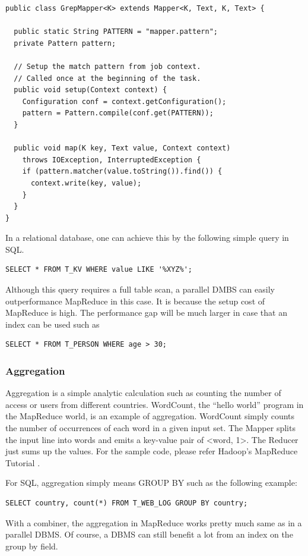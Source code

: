 \documentclass[11pt]{book}
\begin{document}
\begin{lstlisting}
public class GrepMapper<K> extends Mapper<K, Text, K, Text> {

  public static String PATTERN = "mapper.pattern";
  private Pattern pattern;

  // Setup the match pattern from job context.
  // Called once at the beginning of the task.
  public void setup(Context context) {
    Configuration conf = context.getConfiguration();
    pattern = Pattern.compile(conf.get(PATTERN));
  }

  public void map(K key, Text value, Context context)
    throws IOException, InterruptedException {
    if (pattern.matcher(value.toString()).find()) {
      context.write(key, value);
    }
  }
}
\end{lstlisting}
In a relational database, one can achieve this by the following simple query in SQL.

\lstset{language=SQL}
\begin{lstlisting}
SELECT * FROM T_KV WHERE value LIKE '%XYZ%';
\end{lstlisting}
Although this query requires a full table scan, a parallel DMBS can easily outperformance MapReduce in this case. It is because the setup cost of MapReduce is high.
The performance gap will be much larger in case that an index can be used such as

\begin{lstlisting}
SELECT * FROM T_PERSON WHERE age > 30;
\end{lstlisting}
 

\subsubsection{Aggregation}

Aggregation is a simple analytic calculation such as counting the number of access or users from different countries. WordCount, the ``hello world'' program in the MapReduce world, is an example of aggregation. WordCount simply counts the number of occurrences of each word in a given input set. The Mapper splits the input line into words  and emits a key-value pair of \textless word, 1\textgreater. The Reducer just sums up the values. For the sample code, please refer Hadoop's MapReduce Tutorial \cite{MapReduceTutorial}.

For SQL, aggregation simply means GROUP BY such as the following example:
\begin{lstlisting}
SELECT country, count(*) FROM T_WEB_LOG GROUP BY country;
\end{lstlisting}
With a combiner, the aggregation in MapReduce works pretty much same as in a parallel DBMS. Of course, a DBMS can still benefit a lot from an index on the group by field.
\end{document}
